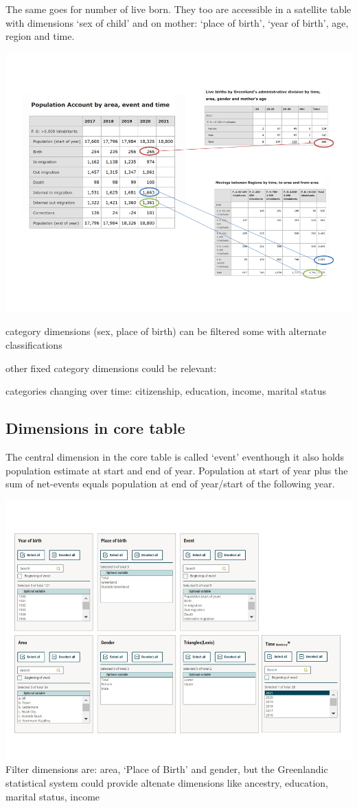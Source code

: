 \documentclass[USenglish]{article}
\begin{document}
The same goes for number of live born. They too are accessible in a satellite table with dimensions ‘sex of child’ and on mother: ‘place of birth’, ‘year of birth’, age, region and time.



\includegraphics[scale=0.4]{images/PopulationAccountCoreSatellite}

category dimensions (sex, place of birth) can be filtered some with alternate classifications

other fixed category dimensions could be relevant: 

categories changing over time:
citizenship, education, income, marital status


\subsection{Dimensions in core table} 
The central dimension in the core table is called ‘event’ eventhough it also holds population estimate at start and end of year. Population at start of year plus the sum of net-events equals population at end of year/start of the following year.

\includegraphics[scale=0.4]{images/PopulationAccountCore}
Filter dimensions are: area, ‘Place of Birth’ and gender, but the Greenlandic statistical system could provide altenate dimensions like ancestry, education, marital status, income
\end{document}
